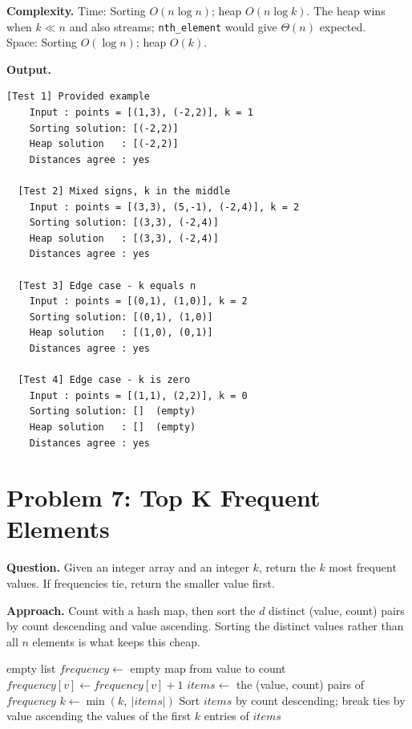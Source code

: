 \documentclass[11pt]{article}
\begin{document}
\textbf{Complexity.} Time: Sorting $O(n\log n)$; heap $O(n\log k)$. The heap wins when $k \ll n$ and also streams; \texttt{nth\_element} would give $\Theta(n)$ expected.\\
Space: Sorting $O(\log n)$; heap $O(k)$.

\textbf{Output.}

\begin{lstlisting}[style=term]
  [Test 1] Provided example
    Input : points = [(1,3), (-2,2)], k = 1
    Sorting solution: [(-2,2)]
    Heap solution   : [(-2,2)]
    Distances agree : yes

  [Test 2] Mixed signs, k in the middle
    Input : points = [(3,3), (5,-1), (-2,4)], k = 2
    Sorting solution: [(3,3), (-2,4)]
    Heap solution   : [(3,3), (-2,4)]
    Distances agree : yes

  [Test 3] Edge case - k equals n
    Input : points = [(0,1), (1,0)], k = 2
    Sorting solution: [(0,1), (1,0)]
    Heap solution   : [(1,0), (0,1)]
    Distances agree : yes

  [Test 4] Edge case - k is zero
    Input : points = [(1,1), (2,2)], k = 0
    Sorting solution: []  (empty)
    Heap solution   : []  (empty)
    Distances agree : yes
\end{lstlisting}

\newpage

\section*{Problem 7: Top K Frequent Elements}
\textbf{Question.} Given an integer array and an integer $k$, return the $k$ most frequent values. If frequencies tie, return the smaller value first.

\textbf{Approach.} Count with a hash map, then sort the $d$ distinct (value, count) pairs by count descending and value ascending. Sorting the distinct values rather than all $n$ elements is what keeps this cheap.

\begin{algorithm}[H]
\caption{Top K Frequent Elements}
\begin{algorithmic}[1]
        \State \Return empty list
    \EndIf
    \State $frequency \gets$ empty map from value to count
        \State $frequency[v] \gets frequency[v] + 1$
    \EndFor
    \State $items \gets$ the (value, count) pairs of $frequency$
    \State $k \gets \min(k,\ |items|)$
    \State Sort $items$ by count descending; break ties by value ascending
    \State \Return the values of the first $k$ entries of $items$
\EndFunction
\end{algorithmic}
\end{algorithm}
\end{document}
